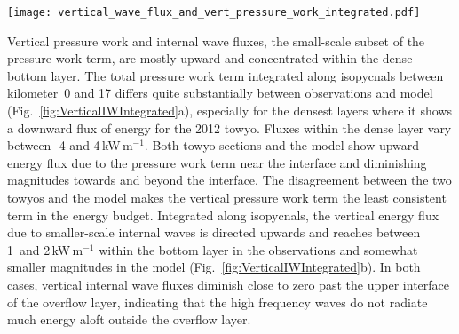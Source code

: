 \documentclass{ametsocV6.1}
\begin{document}
\begin{figure*}
\centerline{\texttt{[image: vertical\_wave\_flux\_and\_vert\_pressure\_work\_integrated.pdf]}}
\caption{
Vertical pressure work integrated horizontally along isopycnals (for towyo observations) and isotherms (for model output) between kilometer~0 and~17.
The dashed lines indicate the upper interface of the dense bottom layer at $\sigma_4=45.94$\,kg\,m$^{-3}$ in the observations and, correspondingly in the temperature-only stratified model, $\theta=0.9^{\circ}$C or $\theta=0.8^{\circ}$ (see text).
Vertical pressure work is shown for all scales in (a) and for lateral scales of less than 5\,km termed \emph{internal waves} in the text in (b).
Note the different x-axis limits between the two panels.
Model small-scale internal wave fluxes are calculated based on locally defined perturbation pressure and velocity (pink). 
For comparison, small-scale internal wave fluxes calculated based on high-pass filtered model velocity and pressure time series (see Appendix~B) are shown in orange. 
}
\label{fig:VerticalIWIntegrated}
\end{figure*}

Vertical pressure work and internal wave fluxes, the small-scale subset of the pressure work term, are mostly upward and concentrated within the dense bottom layer.
The total pressure work term integrated along isopycnals between kilometer~0 and 17 differs quite substantially between observations and model (Fig.~\ref{fig:VerticalIWIntegrated}a), especially for the densest layers where it shows a downward flux of energy for the 2012 towyo. 
Fluxes within the dense layer vary between -4 and 4\,kW\,m$^{-1}$. 
Both towyo sections and the model show upward energy flux due to the pressure work term near the interface and diminishing magnitudes towards and beyond the interface.
The disagreement between the two towyos and the model makes the vertical pressure work term the least consistent term in the energy budget.
Integrated along isopycnals, the vertical energy flux due to smaller-scale internal waves is directed upwards and reaches between 1~and 2\,kW\,m$^{-1}$ within the bottom layer in the observations and somewhat smaller magnitudes in the model (Fig.~\ref{fig:VerticalIWIntegrated}b).
In both cases, vertical internal wave fluxes diminish close to zero past the upper interface of the overflow layer, indicating that the high frequency waves do not radiate much energy aloft outside the overflow layer.
\end{document}
